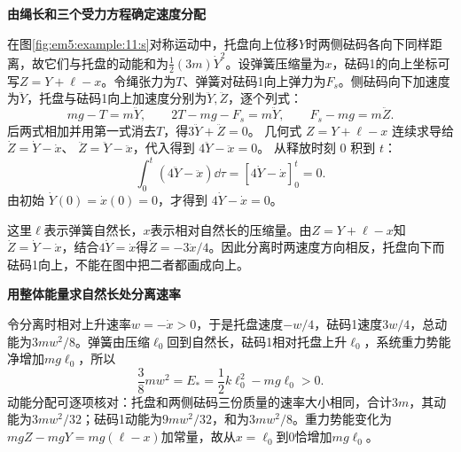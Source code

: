 \begin{solution}\textbf{由绳长和三个受力方程确定速度分配}\par\nobreak
在图\ref{fig:em5:example:11:s}对称运动中，托盘向上位移$Y$时两侧砝码各向下同样距离，故它们与托盘的动能和为$\tfrac12(3m)\dot Y^2$。设弹簧压缩量为$x$，砝码1的向上坐标可写$Z=Y+\ell-x$。令绳张力为$T$、弹簧对砝码1向上弹力为$F_s$。侧砝码向下加速度为$\ddot Y$，托盘与砝码1向上加速度分别为$\ddot Y,\ddot Z$，逐个列式：
\[mg-T=m\ddot Y,\qquad2T-mg-F_s=m\ddot Y,\qquad F_s-mg=m\ddot Z.\]
后两式相加并用第一式消去$T$，得$3\ddot Y+\ddot Z=0$。
几何式 $Z=Y+\ell-x$ 连续求导给 $\dot Z=\dot Y-\dot x$、
$\ddot Z=\ddot Y-\ddot x$，代入得到 $4\ddot Y-\ddot x=0$。
从释放时刻 $0$ 积到 $t$：
\[
\int_0^t(4\ddot Y-\ddot x)\dd\tau
=[4\dot Y-\dot x]_0^t=0.
\]
由初始 $\dot Y(0)=\dot x(0)=0$，才得到 $4\dot Y-\dot x=0$。

这里$\ell$表示弹簧自然长，$x$表示相对自然长的压缩量。由$Z=Y+\ell-x$知$\dot Z=\dot Y-\dot x$，结合$4\dot Y=\dot x$得$\dot Z=-3\dot x/4$。因此分离时两速度方向相反，托盘向下而砝码1向上，不能在图中把二者都画成向上。



\par\medskip{}\noindent\textbf{用整体能量求自然长处分离速率}\par\nobreak
令分离时相对上升速率$w=-\dot x>0$，于是托盘速度$-w/4$，砝码1速度$3w/4$，总动能为$3mw^2/8$。弹簧由压缩$\ell_0$回到自然长，砝码1相对托盘上升$\ell_0$，系统重力势能净增加$mg\ell_0$，所以
\[\frac38mw^2=E_*=\frac12k\ell_0^2-mg\ell_0>0.\]
动能分配可逐项核对：托盘和两侧砝码三份质量的速率大小相同，合计$3m$，其动能为$3mw^2/32$；砝码1动能为$9mw^2/32$，和为$3mw^2/8$。重力势能变化为$mgZ-mgY=mg(\ell-x)$加常量，故从$x=\ell_0$到$0$恰增加$mg\ell_0$。





\end{solution}
